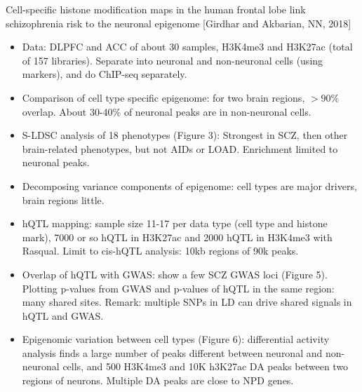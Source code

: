 \documentclass{report}
\begin{document}
Cell-specific histone modification maps in the human frontal lobe link schizophrenia risk to the neuronal epigenome [Girdhar and Akbarian, NN, 2018]
\begin{itemize}
	
	\item Data: DLPFC and ACC of about 30 samples, H3K4me3 and H3K27ac (total of 157 libraries). Separate into neuronal and non-neuronal cells (using markers), and do ChIP-seq separately. 
	
	\item Comparison of cell type specific epigenome: for two brain regions, $>90\%$ overlap. About 30-40\% of neuronal peaks are in non-neuronal cells. 
	
	\item S-LDSC analysis of 18 phenotypes (Figure 3):  Strongest in SCZ, then other brain-related phenotypes, but not AIDs or LOAD. Enrichment limited to neuronal peaks. 
	
	\item Decomposing variance components of epigenome: cell types are major drivers, brain regions little. 
	
	\item hQTL mapping: sample size 11-17 per data type (cell type and histone mark), 7000 or so hQTL in H3K27ac and 2000 hQTL in H3K4me3 with Rasqual. Limit to cis-hQTL analysis: 10kb regions of 90k peaks. 
	
	\item Overlap of hQTL with GWAS: show a few SCZ GWAS loci (Figure 5). Plotting p-values from GWAS and p-values of hQTL in the same region: many shared sites. Remark: multiple SNPs in LD can drive shared signals in hQTL and GWAS. 
	
	\item Epigenomic variation between cell types (Figure 6): differential activity analysis finds a large number of peaks different between neuronal and non-neuronal cells, and 500 H3K4me3 and 10K h3K27ac DA peaks between two regions of neurons. Multiple DA peaks are close to NPD genes. 
\end{itemize}
\end{document}
